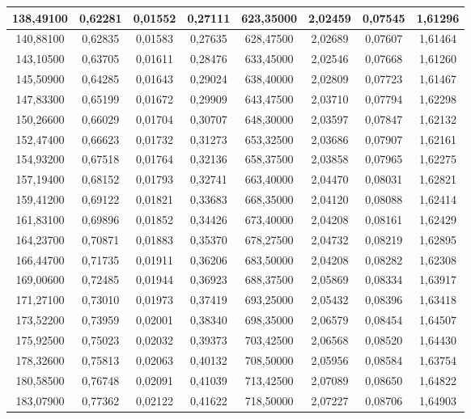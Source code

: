 \documentclass[a4paper,12pt]{article}
\numberwithin{equation}{section}
\begin{document}
\begin{appendices}
\begin{longtable}[c]{|c|c|c|c|c|c|c|c|}
138,49100	&	0,62281	&	0,01552	&	0,27111	&	623,35000	&	2,02459	&	0,07545	&	1,61296	\\\hline
140,88100	&	0,62835	&	0,01583	&	0,27635	&	628,47500	&	2,02689	&	0,07607	&	1,61464	\\\hline
143,10500	&	0,63705	&	0,01611	&	0,28476	&	633,45000	&	2,02546	&	0,07668	&	1,61260	\\\hline
145,50900	&	0,64285	&	0,01643	&	0,29024	&	638,40000	&	2,02809	&	0,07723	&	1,61467	\\\hline
147,83300	&	0,65199	&	0,01672	&	0,29909	&	643,47500	&	2,03710	&	0,07794	&	1,62298	\\\hline
150,26600	&	0,66029	&	0,01704	&	0,30707	&	648,30000	&	2,03597	&	0,07847	&	1,62132	\\\hline
152,47400	&	0,66623	&	0,01732	&	0,31273	&	653,32500	&	2,03686	&	0,07907	&	1,62161	\\\hline
154,93200	&	0,67518	&	0,01764	&	0,32136	&	658,37500	&	2,03858	&	0,07965	&	1,62275	\\\hline
157,19400	&	0,68152	&	0,01793	&	0,32741	&	663,40000	&	2,04470	&	0,08031	&	1,62821	\\\hline
159,41200	&	0,69122	&	0,01821	&	0,33683	&	668,35000	&	2,04120	&	0,08088	&	1,62414	\\\hline
161,83100	&	0,69896	&	0,01852	&	0,34426	&	673,40000	&	2,04208	&	0,08161	&	1,62429	\\\hline
164,23700	&	0,70871	&	0,01883	&	0,35370	&	678,27500	&	2,04732	&	0,08219	&	1,62895	\\\hline
166,44700	&	0,71735	&	0,01911	&	0,36206	&	683,50000	&	2,04208	&	0,08282	&	1,62308	\\\hline
169,00600	&	0,72485	&	0,01944	&	0,36923	&	688,37500	&	2,05869	&	0,08334	&	1,63917	\\\hline
171,27100	&	0,73010	&	0,01973	&	0,37419	&	693,25000	&	2,05432	&	0,08396	&	1,63418	\\\hline
173,52200	&	0,73959	&	0,02001	&	0,38340	&	698,35000	&	2,06579	&	0,08454	&	1,64507	\\\hline
175,92500	&	0,75023	&	0,02032	&	0,39373	&	703,42500	&	2,06568	&	0,08520	&	1,64430	\\\hline
178,32600	&	0,75813	&	0,02063	&	0,40132	&	708,50000	&	2,05956	&	0,08584	&	1,63754	\\\hline
180,58500	&	0,76748	&	0,02091	&	0,41039	&	713,42500	&	2,07089	&	0,08650	&	1,64822	\\\hline
183,07900	&	0,77362	&	0,02122	&	0,41622	&	718,50000	&	2,07227	&	0,08706	&	1,64903	\\\hline

\end{longtable}
\end{appendices}
\end{document}
